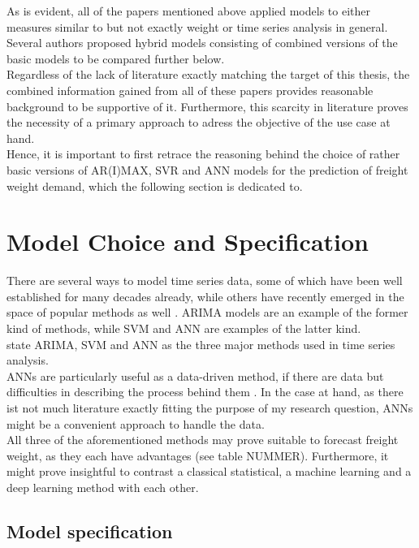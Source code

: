 \documentclass[a4paper, 11pt]{article}
\begin{document}
As is evident, all of the papers mentioned above applied models to either measures similar to but not exactly weight or time series analysis in general. Several authors proposed hybrid models consisting of combined versions of the basic models to be compared further below. \\
Regardless of the lack of literature exactly matching the target of this thesis, the combined information gained from all of these papers provides reasonable background to be supportive of it. Furthermore, this scarcity in literature proves the necessity of a primary approach to adress the objective of the use case at hand.\\
Hence, it is important to first retrace the reasoning behind the choice of rather basic versions of AR(I)MAX, SVR and ANN models for the prediction of freight weight demand, which the following section is dedicated to.\\



\section{Model Choice and Specification}

There are several ways to model time series data, some of which have been well established for many decades already, while others have recently emerged in the space of popular methods as well . ARIMA models are an example of the former kind of methods, while SVM and ANN are examples of the latter kind. \citep{Adhikari.2015}\\
\cite{JoaoF.L.Oliveira.2014} state ARIMA, SVM and ANN as the three major methods used in time series analysis. \\

ANNs are particularly useful as a data-driven method, if there are data but difficulties in describing the process behind them \citep{Zhang.1998}. In the case at hand, as there ist not much literature exactly fitting the purpose of my research question, ANNs might be a convenient approach to handle the data.\\

All three of the aforementioned methods may prove suitable to forecast freight weight, as they each have advantages (see table NUMMER). Furthermore, it might prove insightful to contrast a classical statistical, a machine learning and a deep learning method with each other.


\subsection{Model specification}
\end{document}

